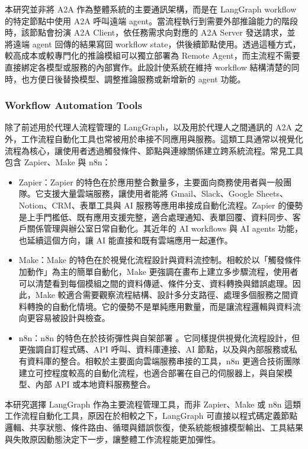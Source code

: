 \documentclass[12pt,a4paper]{article}
\begin{document}
本研究並非將 A2A 作為整體系統的主要通訊架構，而是在 LangGraph workflow 的特定節點中使用 A2A 呼叫遠端 agent。當流程執行到需要外部推論能力的階段時，該節點會扮演 A2A Client，依任務需求向對應的 A2A Server 發送請求，並將遠端 agent 回傳的結果寫回 workflow state，供後續節點使用。透過這種方式，較高成本或較專門化的推論模組可以獨立部署為 Remote Agent，而主流程不需要直接綁定各模型或服務的內部實作。此設計使系統在維持 workflow 結構清楚的同時，也方便日後替換模型、調整推論服務或新增新的 agent 功能。

\subsubsection{Workflow Automation Tools}

除了前述用於代理人流程管理的 LangGraph，以及用於代理人之間通訊的 A2A 之外，工作流程自動化工具也常被用於串接不同應用與服務。這類工具通常以視覺化流程為核心，讓使用者透過觸發條件、節點與連線關係建立跨系統流程。常見工具包含 Zapier、Make 與 n8n：

\begin{itemize}
  \item Zapier：Zapier 的特色在於應用整合數量多，主要面向商務使用者與一般團隊。它支援大量雲端服務，讓使用者能將 Gmail、Slack、Google Sheets、Notion、CRM、表單工具與 AI 服務等應用串接成自動化流程。Zapier 的優勢是上手門檻低、既有應用支援完整，適合處理通知、表單回覆、資料同步、客戶關係管理與辦公室日常自動化。其近年的 AI workflows 與 AI agents 功能，也延續這個方向，讓 AI 能直接和既有雲端應用一起運作。
  \item Make：Make 的特色在於視覺化流程設計與資料流控制。相較於以「觸發條件加動作」為主的簡單自動化，Make 更強調在畫布上建立多步驟流程，使用者可以清楚看到每個模組之間的資料傳遞、條件分支、資料轉換與錯誤處理。因此，Make 較適合需要觀察流程結構、設計多分支路徑、處理多個服務之間資料轉換的自動化情境。它的優勢不是單純應用數量，而是讓流程邏輯與資料流向更容易被設計與檢查。
  \item n8n：n8n 的特色在於技術彈性與自架部署 \cite{n8n_nodes}。它同樣提供視覺化流程設計，但更強調自訂程式碼、API 呼叫、資料庫連接、AI 節點，以及與內部服務或私有資料庫的整合。相較於主要面向雲端服務串接的工具，n8n 更適合技術團隊建立可控程度較高的自動化流程，也適合部署在自己的伺服器上，與自架模型、內部 API 或本地資料服務整合。
\end{itemize}

本研究選擇 LangGraph 作為主要流程管理工具，而非 Zapier、Make 或 n8n 這類工作流程自動化工具，原因在於相較之下，LangGraph 可直接以程式碼定義節點邏輯、共享狀態、條件路由、循環與錯誤恢復，使系統能根據模型輸出、工具結果與失敗原因動態決定下一步，讓整體工作流程能更加彈性。
\end{document}
